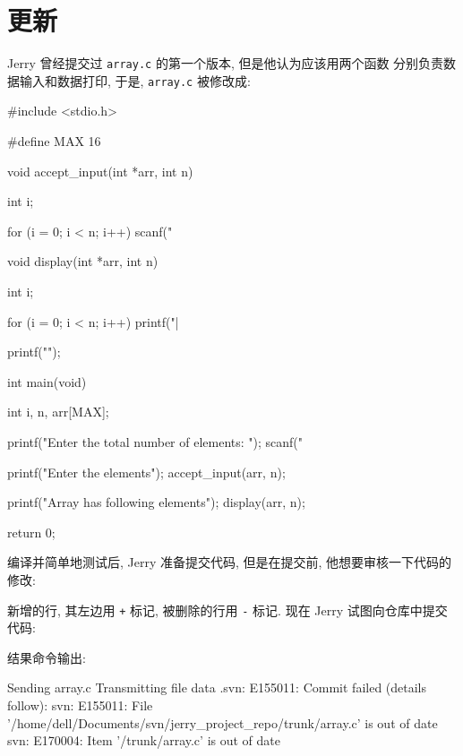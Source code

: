 \documentclass[nofonts, oneside]{ctexart}
\newcommand\svn{\texttt{svn}}
\newcommand\svnci{\texttt{commit}}
\newcommand\svndf{\texttt{diff}}
\begin{document}
\section{更新}
\label{sec:update_process}

Jerry 曾经提交过 \texttt{array.c} 的第一个版本, 但是他认为应该用两个函数
分别负责数据输入和数据打印, 于是, \texttt{array.c} 被修改成:
\begin{ccode}
#include <stdio.h>

#define MAX 16

void accept_input(int *arr, int n)
{
	int i;

	for (i = 0; i < n; i++)
		scanf("%
}

void display(int *arr, int n)
{
	int i;

	for (i = 0; i < n; i++)
		printf("|%

	printf("\n");
}

int main(void)
{
	int i, n, arr[MAX];

	printf("Enter the total number of elements: ");
	scanf("%

	printf("Enter the elements\n");
	accept_input(arr, n);

	printf("Array has following elements\n");
	display(arr, n);

	return 0;
}
\end{ccode}

编译并简单地测试后, Jerry 准备提交代码, 但是在提交前, 他想要审核一下代码的
修改:
新增的行, 其左边用 \texttt{+} 标记, 被删除的行用 \texttt{-} 标记. 现在 Jerry
试图向仓库中提交代码:
结果命令输出:
\begin{svnshell}
Sending        array.c
Transmitting file data .svn: E155011: Commit failed (details follow):
svn: E155011: File '/home/dell/Documents/svn/jerry_project_repo/trunk/array.c' is out of date
svn: E170004: Item '/trunk/array.c' is out of date
\end{svnshell}
\end{document}
